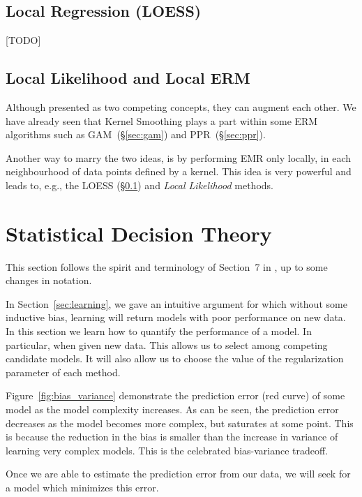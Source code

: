 \documentclass[12pt,a4paper]{article}
\theoremstyle{plain}
\theoremstyle{definition}
\begin{document}
\subsection{Local Regression (LOESS)}
\label{sec:loess}
[TODO]



\subsection{Local Likelihood and Local ERM}
Although presented as two competing concepts, they can augment each other. 
We have already seen that Kernel Smoothing plays a part within some ERM algorithms such as GAM~(\S\ref{sec:gam}) and PPR~(\S \ref{sec:ppr}).

Another way to marry the two ideas, is by performing EMR only locally, in each neighbourhood of data points defined by a kernel. This idea is very powerful and leads to, e.g., the LOESS (\S \ref{sec:loess}) and \emph{Local Likelihood} methods.



\section{Statistical Decision Theory}
\label{sec:desicion_theory}

This section follows the spirit and terminology of Section~7 in \cite{hastie_elements_2003}, up to some changes in notation.

In Section~\ref{sec:learning}, we gave an intuitive argument for which without some inductive bias, learning will return models with poor performance on new data.
In this section we learn how to quantify the performance of a model. In particular, when given new data. This allows us to select among competing candidate models. It will also allow us to choose the value of the regularization parameter of each method.

Figure~\ref{fig:bias_variance} demonstrate the prediction error (red curve) of some model as the model complexity increases. As can be seen, the prediction error decreases as the model becomes more complex, but saturates at some point. 
This is because the reduction in the bias is smaller than the increase in variance of learning very complex models.
This is the celebrated bias-variance tradeoff.

Once we are able to estimate the prediction error from our data, we will seek for a model which minimizes this error.
\end{document}
